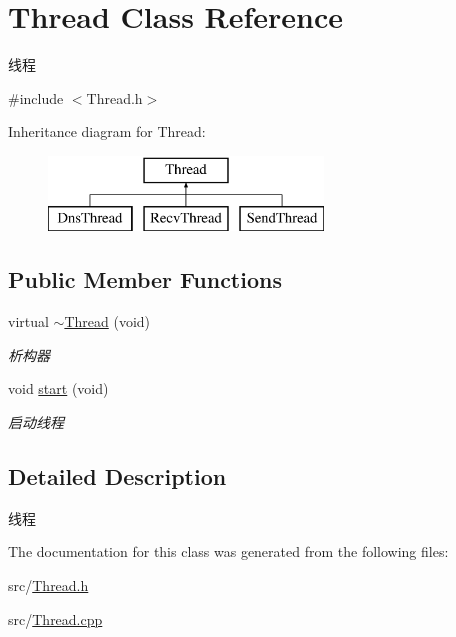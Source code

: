 \hypertarget{class_thread}{}\section{Thread Class Reference}
\label{class_thread}


线程  




{\ttfamily \#include $<$Thread.\+h$>$}

Inheritance diagram for Thread\+:\begin{figure}[H]
\begin{center}
\leavevmode
\includegraphics[height=2.000000cm]{class_thread}
\end{center}
\end{figure}
\subsection*{Public Member Functions}
\begin{DoxyCompactItemize}
\item 
\mbox{\label{class_thread_a440c7d072fc8e81f5120fc3699f2bc0b}} 
virtual \hyperlink{class_thread_a440c7d072fc8e81f5120fc3699f2bc0b}{$\sim$\+Thread} (void)
\begin{DoxyCompactList}\small\item\em 析构器 \end{DoxyCompactList}\item 
\mbox{\label{class_thread_aa1ff0068d8e7ab1c8522827b89937611}} 
void \hyperlink{class_thread_aa1ff0068d8e7ab1c8522827b89937611}{start} (void)
\begin{DoxyCompactList}\small\item\em 启动线程 \end{DoxyCompactList}\end{DoxyCompactItemize}


\subsection{Detailed Description}
线程 

The documentation for this class was generated from the following files\+:\begin{DoxyCompactItemize}
\item 
src/\hyperlink{_thread_8h}{Thread.\+h}\item 
src/\hyperlink{_thread_8cpp}{Thread.\+cpp}\end{DoxyCompactItemize}
